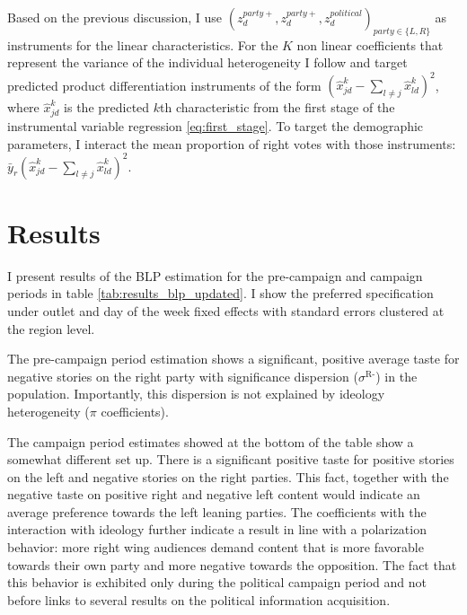 \documentclass[12pt]{article}
\begin{document}
	
	
	

Based on the previous discussion, I use $\left(z_d^{party+},z_d^{party+}, z_d^{political}\right)_{party \in \{L,R\}}$	as instruments for the linear characteristics. For the $ K $ non linear coefficients that represent the variance of the individual heterogeneity I follow \cite{gandhi2019measuring} and target predicted product differentiation instruments of the form $ \left(\hat{x}_{jd}^k- \sum_{l \neq j} \hat{x}_{ld}^k\right)^2 $, where $ \hat{x}_{jd}^k $ is the predicted $ k $th characteristic from the first stage of the instrumental variable regression \ref{eq:first_stage}. To target the demographic parameters, I interact the mean proportion of right votes with those instruments: $ \bar{y}_r\left(\hat{x}_{jd}^k- \sum_{l \neq j} \hat{x}_{ld}^k\right)^2 $.
	

	
	
	\section{Results}
	
	\label{section:results}
	
	
	I present results of the BLP estimation for the pre-campaign and campaign periods in table   \ref{tab:results_blp_updated}. I show the preferred specification under outlet and day of the week fixed effects with standard errors clustered at the region level. 
	
	The pre-campaign period estimation shows a significant, positive average taste for negative stories on the right party with significance dispersion ($\sigma^{\text{R-}}$) in the population. Importantly, this dispersion is not explained by ideology heterogeneity ($\pi$ coefficients).
	
	
	
	The campaign period estimates showed at the bottom of the table show a somewhat different set up. There is a significant positive taste for positive stories on the left and negative stories on the right parties. This fact, together with the negative taste on positive right and negative left content would indicate an average preference towards the left leaning parties. The coefficients with the interaction with ideology further indicate a result in line with a polarization behavior: more right wing audiences demand content that is more favorable towards their own party and more negative towards the opposition. The fact that this behavior is exhibited only during the political campaign period and not before links to several results on the political information acquisition.  
	
\end{document}
